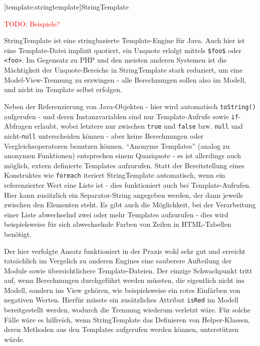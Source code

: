 \documentclass[11pt, a4paper, bibgerm]{book}
\newcommand\icode[1]{\lstinline?#1?}
\newcommand{\todo}[1]{
  \textcolor{red}{TODO: #1}
}
\newcommand\lsection{}
\begin{document}
\lsection[template:stringtemplate]{StringTemplate}

\todo{Beispiele?}

StringTemplate\cite{StringTemplate} ist eine stringbasierte
Template-Engine für Java. Auch hier ist eine Template-Datei implizit
quotiert, ein Unquote erlolgt mittels \icode{$foo$} oder
\icode{<foo>}. Im Gegensatz zu PHP und den meisten anderen Systemen ist
die Mächtigkeit der Unquote-Bereiche in StringTemplate stark reduziert,
um eine Model-View-Trennung zu erzwingen - alle Berechnungen sollen also
im Modell, und nicht im Template selbst erfolgen.

Neben der Referenzierung von Java-Objekten - hier wird automatisch
\icode{toString()} aufgerufen - und deren Instanzvariablen sind nur
Template-Aufrufe sowie \icode{if}-Abfragen erlaubt, wobei letztere nur
zwischen \icode{true} und \icode{false} bzw. \icode{null} und
nicht-\icode{null} unterscheiden können - aber keine Berechnungen oder
Vergleichsoperatoren benutzen können. "`Anonyme Templates"' (analog zu
anonymen Funktionen) entsprechen einem Quasiquote - es ist allerdings
auch möglich, extern definierte Templates aufzurufen. Statt der
Bereitstellung eines Konstruktes wie \icode{foreach} iteriert
StringTemplate automatisch, wenn ein referenzierter Wert eine Liste ist
- dies funktioniert auch bei Template-Aufrufen. Hier kann zusätzlich ein
Separator-String angegeben werden, der dann jeweils zwischen den
Elementen steht. Es gibt auch die Möglichkeit, bei der Verarbeitung
einer Liste abwechselnd zwei oder mehr Templates aufzurufen - dies wird
beispielsweise für sich abwechselnde Farben von Zeilen in HTML-Tabellen
benötigt.

Der hier verfolgte Ansatz funktioniert in der Praxis wohl sehr gut und
erreicht tatsächlich im Vergelich zu anderen Engines eine sauberere
Aufteilung der Module sowie übersichtlichere Template-Dateien. Der
einzige Schwachpunkt tritt auf, wenn Berechnungen durchgeführt werden
müssten, die eigentlich nicht ins Modell, sondern ins View gehören, wie
beispielsweise ein rotes Einfärben von negativen Werten. Hierfür müsste
ein zusätzliches Attribut \icode{isRed} im Modell bereitgestellt werden,
wodurch die Trennung wiederum verletzt wäre. Für solche Fälle wäre es
hilfreich, wenn StringTemplate das Definieren von Helper-Klassen, deren
Methoden aus den Templates aufgerufen werden können, unterstützen würde.
\end{document}
